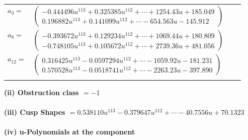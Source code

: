 \documentclass[1p]{elsarticle_modified}
\theoremstyle{definition}
\begin{document}
\begin{tabular}{m{7pt} m{180pt} m{7pt} m{180pt} }
\flushright $a_{3}=$&$\begin{pmatrix}-0.444496 u^{113}+0.325385 u^{112}+\cdots+1254.43 u+185.049\\0.196882 u^{113}+0.141099 u^{112}+\cdots-654.563 u-145.912\end{pmatrix}$ \\
\flushright $a_{8}=$&$\begin{pmatrix}-0.393672 u^{113}+0.129234 u^{112}+\cdots+1069.44 u+180.809\\-0.748105 u^{113}+0.105672 u^{112}+\cdots+2739.36 u+481.056\end{pmatrix}$ \\
\flushright $a_{12}=$&$\begin{pmatrix}0.316425 u^{113}-0.0597294 u^{112}+\cdots-1059.92 u-181.231\\0.570528 u^{113}-0.0518741 u^{112}+\cdots-2263.23 u-397.890\end{pmatrix}$\\&\end{tabular}
\flushleft \textbf{(ii) Obstruction class $= -1$}\\~\\
\flushleft \textbf{(iii) Cusp Shapes $= 0.538110 u^{113}-0.379647 u^{112}+\cdots-40.7556 u+70.1323$}\\~\\
\newpage\renewcommand{\arraystretch}{1}
\flushleft \textbf{(iv) u-Polynomials at the component}\newline \\
\end{document}
